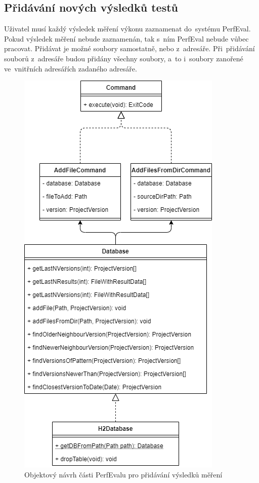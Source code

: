 \subsection{Přidávání nových výsledků testů}

Uživatel musí každý výsledek měření výkonu zaznamenat do~systému PerfEval. Pokud výsledek měření nebude zaznamenán, tak s~ním
PerfEval nebude vůbec pracovat. Přidávat je možné soubory samostatně, nebo z~adresáře. Při~přidávání souborů z~adresáře budou
přidány všechny soubory, a~to i~soubory zanořené ve~vnitřních adresářích zadaného adresáře.

\begin{figure}[!ht]
    \centering
    \includegraphics[height=0.5\textheight]{../img/perfeval_h2db.png}
    \caption{Objektový návrh části PerfEvalu pro přidávání výsledků měření}
\end{figure}


